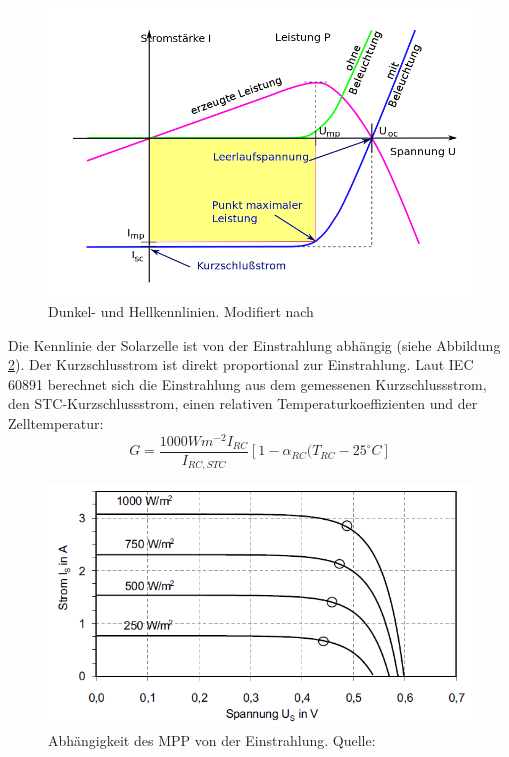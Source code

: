 \documentclass[a4paper,bibtotoc,oneside]{scrbook}
\begin{document}
\begin{figure}[htbp]
\centering
\includegraphics[width=125mm]{img/kennlinie.png}
\caption{Dunkel- und Hellkennlinien. Modifiert nach \cite{kl}}\label{kennlinie}
\end{figure}

Die Kennlinie der Solarzelle ist von der Einstrahlung abhängig (siehe Abbildung \ref{mpp}). Der Kurzschlusstrom ist direkt proportional zur Einstrahlung.
Laut IEC 60891 \cite{norm891} berechnet sich die Einstrahlung aus dem gemessenen Kurzschlussstrom, den STC-Kurzschlussstrom, einen relativen Temperaturkoeffizienten und der Zelltemperatur:
\begin{equation}
G = \frac{1000Wm^{-2}I_{RC}}{I_{RC,STC}} [1 - \alpha_{RC}(T_{RC}-25^{\circ} C]
\end{equation}

\begin{figure}[htbp]
\centering
\includegraphics[width=125mm]{img/kennlinien.png}
\caption{Abhängigkeit des MPP von der Einstrahlung. Quelle: \cite{pv}}\label{mpp}
\end{figure}
\end{document}
